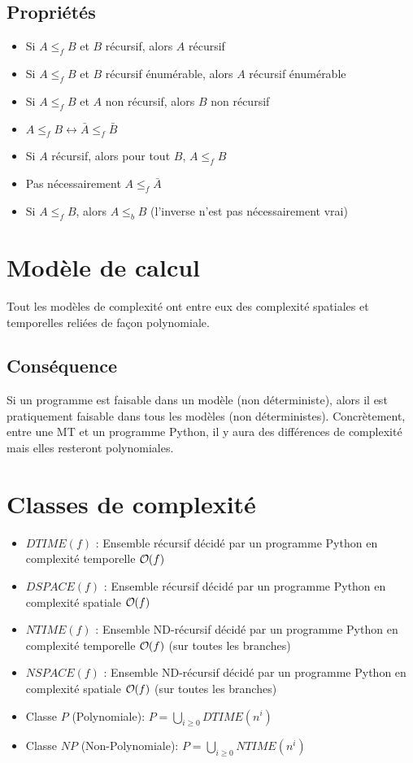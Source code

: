 \subsection{Propriétés}

\begin{itemize}
\item Si $A \leq_f B$ et $B$ récursif, alors $A$ récursif
\item Si $A \leq_f B$ et $B$ récursif énumérable, alors $A$ récursif énumérable
\item Si $A \leq_f B$ et $A$ non récursif, alors $B$ non récursif
\item $A \leq_f B \leftrightarrow \bar{A} \leq_f \bar{B}$
\item Si $A$ récursif, alors pour tout $B$, $A \leq_f B$
\item Pas nécessairement $A \leq_f \bar{A}$
\item Si $A \leq_f B$, alors $A \leq_b B$ (l'inverse n'est pas nécessairement vrai)
\end{itemize}

\section{Modèle de calcul}

Tout les modèles de complexité ont entre eux des complexité spatiales et temporelles reliées de façon polynomiale.

\subsection{Conséquence}

Si un programme est faisable dans un modèle (non déterministe), alors il est pratiquement faisable dans tous les modèles (non déterministes). Concrètement, entre une MT et un programme Python, il y aura des différences de complexité mais elles resteront polynomiales.

\section{Classes de complexité}

\begin{itemize}
\item $DTIME(f)$ : Ensemble récursif décidé par un programme Python en complexité temporelle $\bigO(f)$
\item $DSPACE(f)$ : Ensemble récursif décidé par un programme Python en complexité spatiale $\bigO(f)$
\item $NTIME(f)$ : Ensemble ND-récursif décidé par un programme Python en complexité temporelle $\bigO(f)$ (sur toutes les branches)
\item $NSPACE(f)$ : Ensemble ND-récursif décidé par un programme Python en complexité spatiale $\bigO(f)$ (sur toutes les branches)
\item Classe $P$ (Polynomiale): $P = \underset{i \geq 0}{\bigcup} DTIME(n^i)$
\item Classe $NP$ (Non-Polynomiale): $P = \underset{i \geq 0}{\bigcup} NTIME(n^i)$
\end{itemize}

